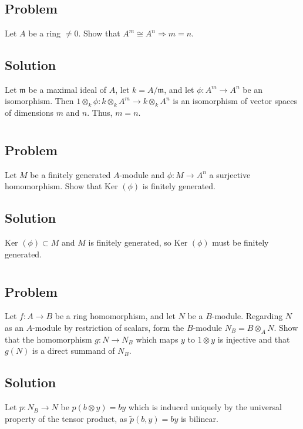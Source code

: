 \documentclass[book,12pt,oneside,openany]{memoir}
\begin{document}
\section{}
\subsection{Problem}
Let $A$ be a ring $\neq 0$. Show that $A^m \cong A^n \Rightarrow m = n$.

\subsection{Solution}
Let $\mathfrak{m}$ be a maximal ideal of $A$, let $k = A/\mathfrak{m}$, and let $\phi: A^m \rightarrow A^n$ be an isomorphism. Then $1 \otimes_k \phi: k \otimes_k A^m \rightarrow k \otimes_k A^n$ is an isomorphism of vector spaces of dimensions $m$ and $n$. Thus, $m = n$.

\section{}
\subsection{Problem}
Let $M$ be a finitely generated $A$-module and $\phi: M \rightarrow A^n$ a surjective homomorphism. Show that Ker $(\phi)$ is finitely generated.

\subsection{Solution}
Ker $(\phi) \subset M$ and $M$ is finitely generated, so Ker $(\phi)$ must be finitely generated.

\section{}
\subsection{Problem}
Let $f: A \rightarrow B$ be a ring homomorphism, and let $N$ be a $B$-module. Regarding $N$ as an $A$-module by restriction of scalars, form the $B$-module $N_B = B \otimes_A N$. Show that the homomorphism $g: N \rightarrow N_B$ which maps $y$ to $1 \otimes y$ is injective and that $g(N)$ is a direct summand of $N_B$.

\subsection{Solution}
Let $p:N_B\to N$ be $p(b\otimes y)=by$ which is induced uniquely by the
universal property of the tensor product, as $\tilde{p}(b,y)=by$ is
bilinear.
\end{document}
